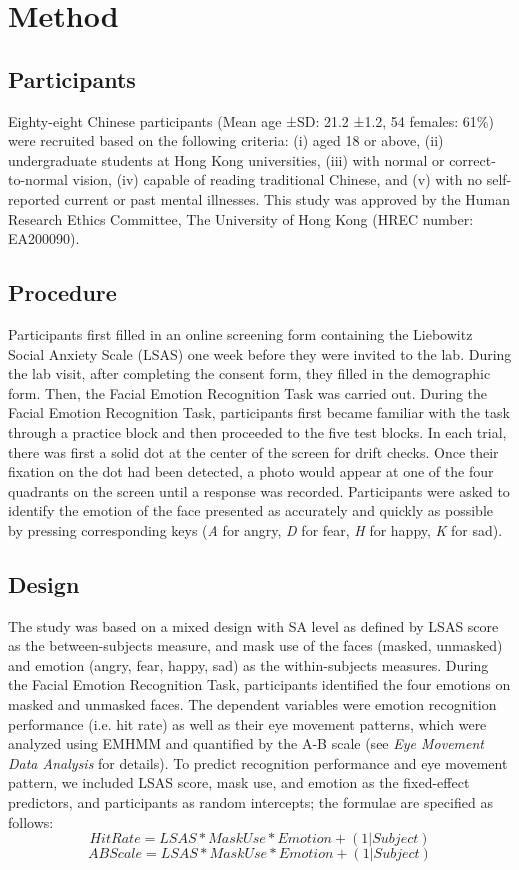 \section{Method}
\subsection{Participants}
Eighty-eight Chinese participants (Mean age ±SD: 21.2 ±1.2, 54 females: 61\%) were recruited based on the following criteria: (i) aged 18 or above, (ii) undergraduate students at Hong Kong universities, (iii) with normal or correct-to-normal vision, (iv) capable of reading traditional Chinese, and (v) with no self-reported current or past mental illnesses. This study was approved by the Human Research Ethics Committee, The University of Hong Kong (HREC number: EA200090).
\subsection{Procedure}
Participants first filled in an online screening form containing the Liebowitz Social Anxiety Scale (LSAS) one week before they were invited to the lab. During the lab visit, after completing the consent form, they filled in the demographic form. Then, the Facial Emotion Recognition Task was carried out.
During the Facial Emotion Recognition Task, participants first became familiar with the task through a practice block and then proceeded to the five test blocks. In each trial, there was first a solid dot at the center of the screen for drift checks. Once their fixation on the dot had been detected, a photo would appear at one of the four quadrants on the screen until a response was recorded. Participants were asked to identify the emotion of the face presented as accurately and quickly as possible by pressing corresponding keys (\textit{A} for angry, \textit{D} for fear, \textit{H} for happy, \textit{K} for sad).
\subsection{Design}
The study was based on a mixed design with SA level as defined by LSAS score as the between-subjects measure, and mask use of the faces (masked, unmasked) and emotion (angry, fear, happy, sad) as the within-subjects measures. During the Facial Emotion Recognition Task, participants identified the four emotions on masked and unmasked faces. The dependent variables were emotion recognition performance (i.e. hit rate) as well as their eye movement patterns, which were analyzed using EMHMM and quantified by the A-B scale (see \textit{Eye Movement Data Analysis} for details).
To predict recognition performance and eye movement pattern, we included LSAS score, mask use, and emotion as the fixed-effect predictors, and participants as random intercepts; the formulae are specified as follows:
\begin{equation} \label{eq1}
Hit Rate = LSAS*MaskUse*Emotion+(1|Subject)
\end{equation}
\begin{equation} \label{eq2}
AB Scale = LSAS*MaskUse*Emotion+(1|Subject)
\end{equation}
